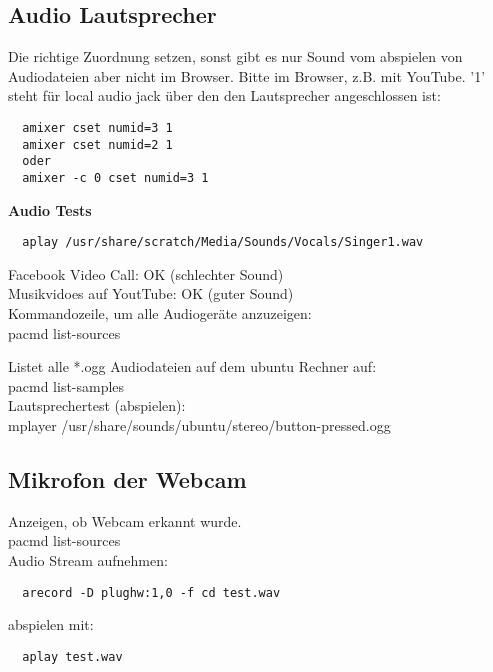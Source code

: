 \subsection{Audio Lautsprecher} \label{RefLautsprecher}

Die richtige Zuordnung setzen, sonst gibt es nur Sound vom 
abspielen von Audiodateien aber nicht im Browser. Bitte im 
Browser, z.B. mit YouTube. '1' steht für local audio jack über 
den den Lautsprecher angeschlossen ist:
\begin{verbatim}
  amixer cset numid=3 1
  amixer cset numid=2 1
  oder
  amixer -c 0 cset numid=3 1
\end{verbatim}

\textbf{Audio Tests}
\begin{verbatim}
  aplay /usr/share/scratch/Media/Sounds/Vocals/Singer1.wav
\end{verbatim}
Facebook Video Call: OK (schlechter Sound)\\
Musikvidoes auf YoutTube: OK (guter Sound)\\

Kommandozeile, um alle Audiogeräte anzuzeigen:\\
pacmd list-sources

Listet alle *.ogg Audiodateien auf dem ubuntu Rechner auf:\\
pacmd list-samples\\
Lautsprechertest (abspielen):\\
mplayer /usr/share/sounds/ubuntu/stereo/button-pressed.ogg 

\subsection{Mikrofon der Webcam}
Anzeigen, ob Webcam erkannt wurde.\\
pacmd list-sources\\ 

Audio Stream aufnehmen:
\begin{verbatim}
  arecord -D plughw:1,0 -f cd test.wav
\end{verbatim}
abspielen mit:
\begin{verbatim}
  aplay test.wav
\end{verbatim}

